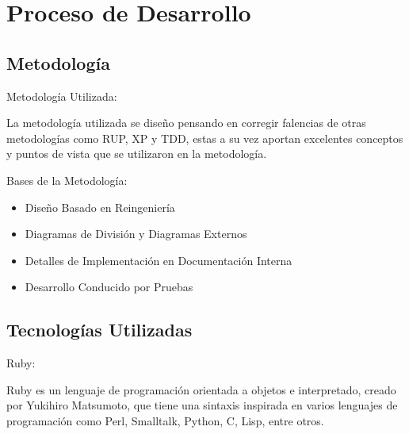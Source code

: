 \section{Proceso de Desarrollo}


\subsection{Metodología}

\begin{frame}{Metodología Utilizada:\newline}

La metodología utilizada se diseño pensando en corregir falencias de otras metodologías como RUP, XP y TDD, estas a su vez aportan excelentes conceptos y puntos de vista que se utilizaron en la metodología. 

\end{frame}

\begin{frame}{Bases de la Metodología:\newline}

\begin{itemize}
	
	\item Diseño Basado en Reingeniería
	\pause
	\item Diagramas de División y Diagramas Externos
	\pause
	\item Detalles de Implementación en Documentación Interna
	\pause
	\item Desarrollo Conducido por Pruebas
	
\end{itemize}

\end{frame}


\subsection{Tecnologías Utilizadas}

\begin{frame}{Ruby:\newline}

Ruby es un lenguaje de programación orientada a objetos e interpretado, creado por Yukihiro Matsumoto, que tiene una sintaxis inspirada en varios lenguajes de programación como Perl, Smalltalk, Python, C, Lisp, entre otros.

\end{frame}

